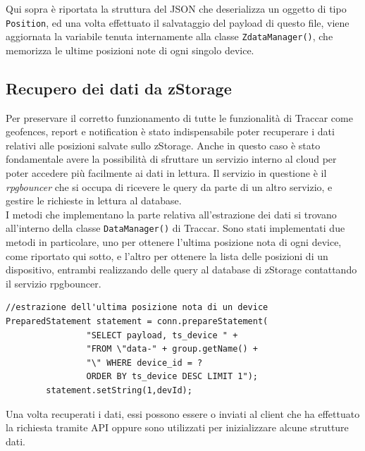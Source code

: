 \documentclass[a4paper,titlepage,12pt]{report}
\begin{document}
{\noindent Qui sopra è riportata la struttura del JSON che deserializza un oggetto di tipo \texttt{Position}, ed una volta effettuato il salvataggio del payload di questo file, viene aggiornata la variabile tenuta internamente alla classe \texttt{ZdataManager()}, che memorizza le ultime posizioni note di ogni singolo device.

\subsection{
Recupero dei dati da zStorage}
Per preservare il corretto funzionamento di tutte le funzionalità di Traccar come geofences, report e notification è stato indispensabile poter recuperare i dati relativi alle posizioni salvate sullo zStorage. Anche in questo caso è stato fondamentale avere la possibilità di sfruttare un servizio interno al cloud per poter accedere più facilmente ai dati in lettura. Il servizio in questione è il \textit{rpgbouncer} che si occupa di ricevere le query da parte di un altro servizio, e gestire le richieste in lettura al database. \\
I metodi che implementano la parte relativa all'estrazione dei dati si trovano all'interno della classe \texttt{DataManager()} di Traccar. Sono stati implementati due metodi in particolare, uno per ottenere l'ultima posizione nota di ogni device, come riportato qui sotto, e l'altro per ottenere la lista delle posizioni di un dispositivo, entrambi realizzando delle query al database di zStorage contattando il servizio rpgbouncer. 

\begin{verbatim}
//estrazione dell'ultima posizione nota di un device
PreparedStatement statement = conn.prepareStatement(
				"SELECT payload, ts_device " +
                "FROM \"data-" + group.getName() +
                "\" WHERE device_id = ? 
                ORDER BY ts_device DESC LIMIT 1");
        statement.setString(1,devId);
\end{verbatim}


\noindent Una volta recuperati i dati, essi possono essere o inviati al client che ha effettuato la richiesta tramite API oppure sono utilizzati per inizializzare alcune strutture dati.

}
\end{document}
